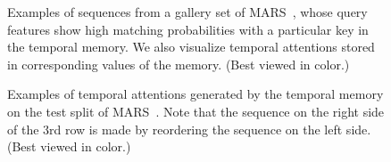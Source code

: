 \documentclass[10pt,twocolumn,letterpaper]{article}
\begin{document}
		\begin{figure}[t!]
			\centering
			\renewcommand*{\thesubfigure}{}
			\hspace{-0.3cm}
			\hspace{-0.3cm}
			\hspace{-0.2cm}
			\vspace{-0.5cm}
			\caption{Examples of sequences from a gallery set of MARS~\cite{zheng2016mars}, whose query features show high matching probabilities with a particular key in the temporal memory. We also visualize temporal attentions stored in corresponding values of the memory. (Best viewed in color.)}
			\label{fig:tmem_key}
			\vspace{-0.6cm}
		\end{figure}
		
		\begin{figure}
			\centering
			\vspace{-0.2cm}
			\renewcommand*{\thesubfigure}{}
			\hspace{-0.3cm}
			\hspace{-0.25cm}
			\vspace{-0.6cm}
			\caption{Examples of temporal attentions generated by the temporal memory on the test split of MARS~\cite{zheng2016mars}. Note that the sequence on the right side of the 3rd row is made by reordering the sequence on the left side. (Best viewed in color.)}
			\label{fig:tmem_val}
			\vspace{-0.6cm}
		\end{figure}
\end{document}
